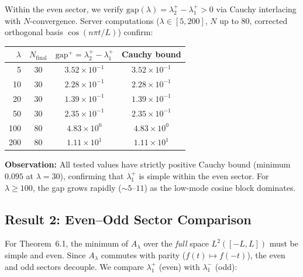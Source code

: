 \documentclass[12pt,a4paper]{article}
\theoremstyle{definition}
\theoremstyle{remark}
\begin{document}
Within the even sector, we verify $\mathrm{gap}(\lambda) = \lambda_2^+ - \lambda_1^+ > 0$ via Cauchy interlacing with $N$-convergence. Server computations ($\lambda \in [5,200]$, $N$ up to 80, corrected orthogonal basis $\cos(n\pi t/L)$) confirm:

\medskip
\begin{center}
\renewcommand{\arraystretch}{1.2}
\begin{tabular}{r|c|c|c}
$\lambda$ & $N_{\mathrm{final}}$ & $\mathrm{gap}^+ = \lambda_2^+ - \lambda_1^+$ & Cauchy bound \\\hline
5 & 30 & $3.52\times 10^{-1}$ & $3.52\times 10^{-1}$ \\
10 & 30 & $2.28\times 10^{-1}$ & $2.28\times 10^{-1}$ \\
20 & 30 & $1.39\times 10^{-1}$ & $1.39\times 10^{-1}$ \\
50 & 30 & $2.35\times 10^{-1}$ & $2.35\times 10^{-1}$ \\
100 & 80 & $4.83\times 10^{0}$ & $4.83\times 10^{0}$ \\
200 & 80 & $1.11\times 10^{1}$ & $1.11\times 10^{1}$ \\
\end{tabular}
\end{center}

\medskip\noindent
\textbf{Observation:} All tested values have strictly positive Cauchy bound (minimum $0.095$ at $\lambda=30$), confirming that $\lambda_1^+$ is simple within the even sector. For $\lambda \geq 100$, the gap grows rapidly ($\sim 5$--$11$) as the low-mode cosine block dominates.

\subsection{Result 2: Even--Odd Sector Comparison}

For Theorem~6.1, the minimum of $A_\lambda$ over the \emph{full} space $L^2([-L,L])$ must be simple and even. Since $A_\lambda$ commutes with parity ($f(t)\mapsto f(-t)$), the even and odd sectors decouple. We compare $\lambda_1^+$ (even) with $\lambda_1^-$ (odd):
\end{document}
